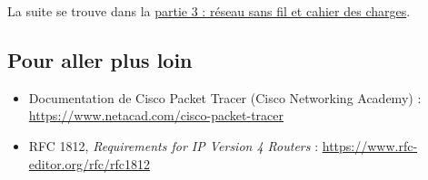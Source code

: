 \documentclass[
  french,
  10pt,
  a4paper,
]{scrartcl}
\providecommand{\tightlist}{%
  \setlength{\itemsep}{0pt}\setlength{\parskip}{0pt}}
\begin{document}
La suite se trouve dans la \href{../tp-creation-lan-3/index.qmd}{partie
3 : réseau sans fil et cahier des charges}.

\subsection{Pour aller plus loin}\label{pour-aller-plus-loin}

\begin{itemize}
\tightlist
\item
  Documentation de Cisco Packet Tracer (Cisco Networking Academy) :
  \url{https://www.netacad.com/cisco-packet-tracer}
\item
  RFC 1812, \emph{Requirements for IP Version 4 Routers} :
  \url{https://www.rfc-editor.org/rfc/rfc1812}
\end{itemize}
\end{document}
